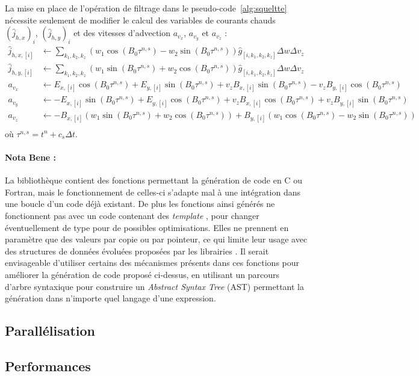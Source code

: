 La mise en place de l'opération de filtrage dans le pseudo-code~\ref{alg:squeltte} nécessite seulement de modifier le calcul des variables de courants chauds $\left(\hat{j}_{h,x}\right)_i$, $\left(\hat{j}_{h,y}\right)_i$ et des vitesses d'advection $a_{v_x}$, $a_{v_y}$ et $a_{v_z}$ :
$$
  \begin{aligned}
    \hat{j}_{h,x,[i]} &\gets \sum_{k_1,k_2,k_z} ( w_1\cos(B_0\tau^{n,s}) - w_2\sin(B_0\tau^{n,s}) ) \hat{g}_{[i,k_1,k_2,k_z]} \Delta w\Delta v_z\\
    \hat{j}_{h,y,[i]} &\gets \sum_{k_1,k_2,k_z} ( w_1\sin(B_0\tau^{n,s}) + w_2\cos(B_0\tau^{n,s}) ) \hat{g}_{[i,k_1,k_2,k_z]} \Delta w\Delta v_z\\
    a_{v_x} &\gets E_{x,[i]}\cos(B_0\tau^{n,s}) + E_{y,[i]}\sin(B_0\tau^{n,s}) + v_zB_{x,[i]}\sin(B_0\tau^{n,s}) - v_zB_{y,[i]}\cos(B_0\tau^{n,s})\\
    a_{v_y} &\gets -E_{x,[i]}\sin(B_0\tau^{n,s}) + E_{y,[i]}\cos(B_0\tau^{n,s}) + v_zB_{x,[i]}\cos(B_0\tau^{n,s}) + v_zB_{y,[i]}\sin(B_0\tau^{n,s})\\
    a_{v_z} &\gets -B_{x,[i]}(w_1\sin(B_0\tau^{n,s}) + w_2\cos(B_0\tau^{n,s})) + B_{y,[i]}(w_1\cos(B_0\tau^{n,s}) - w_2\sin(B_0\tau^{n,s}) )\\
  \end{aligned}
$$
où $\tau^{n,s}=t^n+c_s\Delta t$.

\paragraph{Nota Bene :} La bibliothèque \sympy{} contient des fonctions permettant la génération de code en C ou Fortran, mais le fonctionnement de celles-ci s'adapte mal à une intégration dans une boucle d'un code déjà existant. De plus les fonctions ainsi générés ne fonctionnent pas avec un code contenant des \emph{template} \CC, pour changer éventuellement de type pour de possibles optimisations. Elles ne prennent en paramètre que des valeurs par copie ou par pointeur, ce qui limite leur usage avec des structures de données évoluées proposées par les librairies \CC. Il serait envisageable d'utiliser certains des mécanismes présents dans ces fonctions pour améliorer la génération de code proposé ci-dessus, en utilisant un parcours d'arbre syntaxique pour construire un \emph{Abstract Syntax Tree} (AST) permettant la génération dans n'importe quel langage d'une expression. 

\subsection{Parallélisation}

\subsection{Performances}

